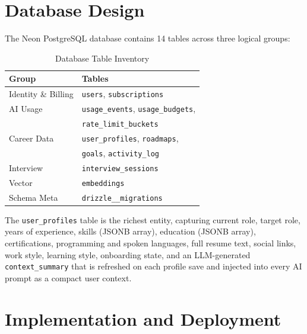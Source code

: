 \documentclass[conference]{IEEEtran}
\begin{document}
\section{Database Design}
\label{sec:db}

The Neon PostgreSQL database contains 14 tables across three logical groups:

\begin{table}[htbp]
\caption{Database Table Inventory}
\label{tab:tables}
\centering
\begin{tabular}{ll}
\toprule
\textbf{Group} & \textbf{Tables} \\
\midrule
Identity \& Billing  & \texttt{users}, \texttt{subscriptions} \\
AI Usage             & \texttt{usage\_events}, \texttt{usage\_budgets}, \\
                     & \texttt{rate\_limit\_buckets} \\
Career Data          & \texttt{user\_profiles}, \texttt{roadmaps}, \\
                     & \texttt{goals}, \texttt{activity\_log} \\
Interview            & \texttt{interview\_sessions} \\
Vector               & \texttt{embeddings} \\
Schema Meta          & \texttt{drizzle\_\_migrations} \\
\bottomrule
\end{tabular}
\end{table}

The \texttt{user\_profiles} table is the richest entity, capturing current
role, target role, years of experience, skills (JSONB array), education
(JSONB array), certifications, programming and spoken languages, full resume
text, social links, work style, learning style, onboarding state, and an
LLM-generated \texttt{context\_summary} that is refreshed on each profile
save and injected into every AI prompt as a compact user context.

\section{Implementation and Deployment}
\label{sec:impl}
\end{document}
